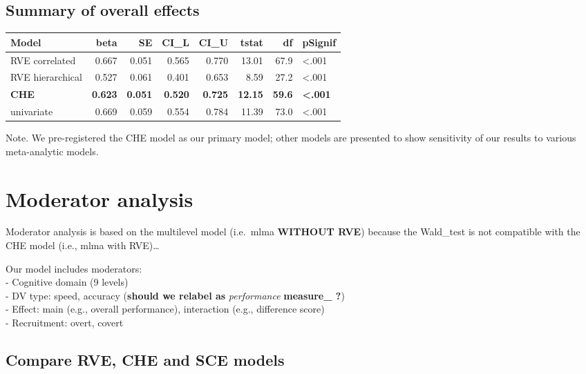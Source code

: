 \documentclass[
]{book}
\begin{document}
\hypertarget{summary-of-overall-effects}{%
\subsection{Summary of overall effects}\label{summary-of-overall-effects}}

\begin{table}
\centering
\begin{tabular}{l|r|r|r|r|r|r|l}
\hline
Model & beta & SE & CI\_L & CI\_U & tstat & df & pSignif\\
\hline
RVE correlated & 0.667 & 0.051 & 0.565 & 0.770 & 13.01 & 67.9 & <.001\\
\hline
RVE hierarchical & 0.527 & 0.061 & 0.401 & 0.653 & 8.59 & 27.2 & <.001\\
\hline
\textbf{CHE} & \textbf{0.623} & \textbf{0.051} & \textbf{0.520} & \textbf{0.725} & \textbf{12.15} & \textbf{59.6} & \textbf{<.001}\\
\hline
univariate & 0.669 & 0.059 & 0.554 & 0.784 & 11.39 & 73.0 & <.001\\
\hline
\end{tabular}
\end{table}

Note. We pre-registered the CHE model as our primary model; other models are presented
to show sensitivity of our results to various meta-analytic models.

\hypertarget{moderator-analysis}{%
\section{Moderator analysis}\label{moderator-analysis}}

Moderator analysis is based on the multilevel model (i.e.~mlma \textbf{WITHOUT RVE}) because the
Wald\_test is not compatible with the CHE model (i.e., mlma with RVE)\ldots{}

Our model includes moderators:\\
- Cognitive domain (9 levels)\\
- DV type: speed, accuracy (\textbf{should we relabel as} \emph{performance} \textbf{measure\_ ?})\\
- Effect: main (e.g., overall performance), interaction (e.g., difference score)\\
- Recruitment: overt, covert

\hypertarget{compare-rve-che-and-sce-models}{%
\subsection{Compare RVE, CHE and SCE models}\label{compare-rve-che-and-sce-models}}
\end{document}
